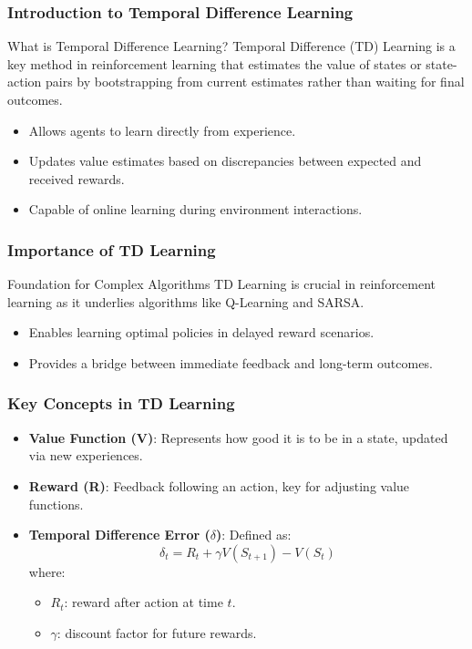 \documentclass[aspectratio=169]{beamer}
\begin{document}
\frame{\titlepage}

\begin{frame}[fragile]
    \frametitle{Introduction to Temporal Difference Learning}
    \begin{block}{What is Temporal Difference Learning?}
        Temporal Difference (TD) Learning is a key method in reinforcement learning that estimates the value of states or state-action pairs by bootstrapping from current estimates rather than waiting for final outcomes.
    \end{block}
    \begin{itemize}
        \item Allows agents to learn directly from experience.
        \item Updates value estimates based on discrepancies between expected and received rewards.
        \item Capable of online learning during environment interactions.
    \end{itemize}
\end{frame}

\begin{frame}[fragile]
    \frametitle{Importance of TD Learning}
    \begin{block}{Foundation for Complex Algorithms}
        TD Learning is crucial in reinforcement learning as it underlies algorithms like Q-Learning and SARSA.
    \end{block}
    \begin{itemize}
        \item Enables learning optimal policies in delayed reward scenarios.
        \item Provides a bridge between immediate feedback and long-term outcomes.
    \end{itemize}
\end{frame}

\begin{frame}[fragile]
    \frametitle{Key Concepts in TD Learning}
    \begin{itemize}
        \item \textbf{Value Function (V)}: Represents how good it is to be in a state, updated via new experiences.
        \item \textbf{Reward (R)}: Feedback following an action, key for adjusting value functions.
        \item \textbf{Temporal Difference Error ($\delta$)}: Defined as:
        \begin{equation}
            \delta_t = R_t + \gamma V(S_{t+1}) - V(S_t)
        \end{equation}
        where:
        \begin{itemize}
            \item $R_t$: reward after action at time $t$.
            \item $\gamma$: discount factor for future rewards.
        \end{itemize}
    \end{itemize}
\end{frame}
\end{document}
